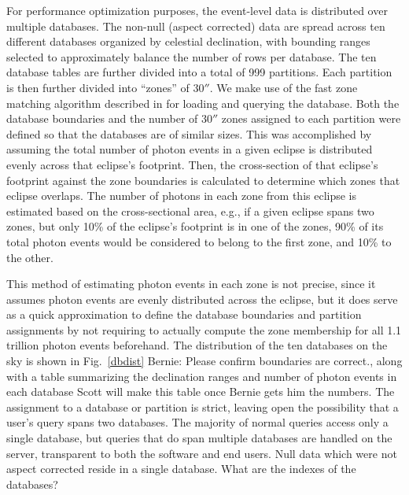 \documentclass[5p]{elsarticle}
\begin{document}
For performance optimization purposes, the event-level data is distributed over multiple databases. The non-null (aspect corrected) data are spread across ten different databases organized by celestial declination, with bounding ranges selected to approximately balance the number of rows per database.  The ten database tables are further divided into a total of 999 partitions. Each partition is then further divided into ``zones'' of $30''$. We make use of the fast zone matching algorithm described in \citet{gra2006} for loading and querying the database.  Both the database boundaries and the number of $30''$ zones assigned to each partition were defined so that the databases are of similar sizes.  This was accomplished by assuming the total number of photon events in a given eclipse is distributed evenly across that eclipse's footprint.  Then, the cross-section of that eclipse's footprint against the zone boundaries is calculated to determine which zones that eclipse overlaps.  The number of photons in each zone from this eclipse is estimated based on the cross-sectional area, e.g., if a given eclipse spans two zones, but only 10\% of the eclipse's footprint is in one of the zones, 90\% of its total photon events would be considered to belong to the first zone, and 10\% to the other.

This method of estimating photon events in each zone is not precise, since it assumes photon events are evenly distributed across the eclipse, but it does serve as a quick approximation to define the database boundaries and partition assignments by not requiring to actually compute the zone membership for all 1.1 trillion photon events beforehand.  The distribution of the ten databases on the sky is shown in Fig.\ \ref{dbdist} {\color{red}Bernie: Please confirm boundaries are correct.}, along with a table summarizing the declination ranges and number of photon events in each database {\color{red}Scott will make this table once Bernie gets him the numbers}. The assignment to a database or partition is strict, leaving open the possibility that a user's query spans two databases. The majority of normal queries access only a single database, but queries that do span multiple databases are handled on the server, transparent to both the software and end users. Null data which were not aspect corrected reside in a single database.  {\color{red}What are the indexes of the databases?}
\end{document}
